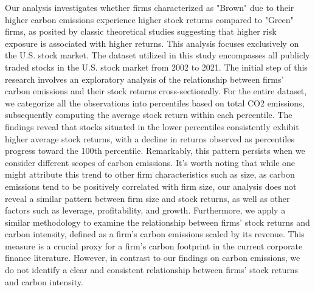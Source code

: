\documentclass[12pt]{article}
\begin{document}
Our analysis investigates whether firms characterized as "Brown" due to their higher carbon emissions experience higher stock returns compared to "Green" firms, as posited by classic theoretical studies suggesting that higher risk exposure is associated with higher returns. This analysis focuses exclusively on the U.S. stock market. The dataset utilized in this study encompasses all publicly traded stocks in the U.S. stock market from 2002 to 2021. The initial step of this research involves an exploratory analysis of the relationship between firms' carbon emissions and their stock returns cross-sectionally. For the entire dataset, we categorize all the observations into percentiles based on total CO2 emissions, subsequently computing the average stock return within each percentile. The findings reveal that stocks situated in the lower percentiles consistently exhibit higher average stock returns, with a decline in returns observed as percentiles progress toward the 100th percentile. Remarkably, this pattern persists when we consider different scopes of carbon emissions. It's worth noting that while one might attribute this trend to other firm characteristics such as size, as carbon emissions tend to be positively correlated with firm size, our analysis does not reveal a similar pattern between firm size and stock returns, as well as other factors such as leverage, profitability, and growth. Furthermore, we apply a similar methodology to examine the relationship between firms' stock returns and carbon intensity, defined as a firm's carbon emissions scaled by its revenue. This measure is a crucial proxy for a firm's carbon footprint in the current corporate finance literature. However, in contrast to our findings on carbon emissions, we do not identify a clear and consistent relationship between firms' stock returns and carbon intensity.
\end{document}
